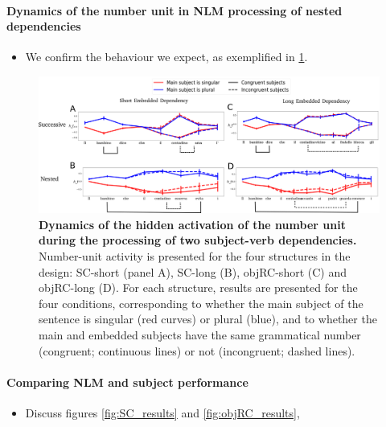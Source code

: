 \paragraph{Dynamics of the number unit in NLM processing of nested dependencies}

\begin{itemize}
\item We confirm the behaviour we expect, as exemplified in \ref{fig:nested_dynamics}.
\end{itemize}

\begin{figure}
    \centering
    \includegraphics[width=\textwidth]{figures/model_activations.png}
    \caption{\textbf{Dynamics of the hidden activation of the number unit during the processing of two subject-verb dependencies.} Number-unit activity is presented for the four structures in the design: SC-short (panel A), SC-long (B), objRC-short (C) and objRC-long (D). For each structure, results are presented for the four conditions, corresponding to whether the main subject of the sentence is singular (red curves) or plural (blue), and to whether the main and embedded subjects have the same grammatical number (congruent; continuous lines) or not (incongruent; dashed lines).}
    \label{fig:nested_dynamics}
\end{figure}

\paragraph{Comparing NLM and subject performance}

\begin{itemize}
\item Discuss figures \ref{fig:SC_results} and \ref{fig:objRC_results},
\end{itemize}

